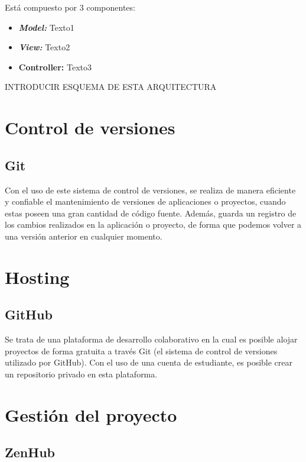 Está compuesto por 3 componentes:
\begin{itemize}
\tightlist
\item
\textit{\textbf{Model: }} Texto1
\item
\textit{\textbf{View: }} Texto2
\item
\textbf{\textbf{Controller: }} Texto3
\end{itemize}


INTRODUCIR ESQUEMA DE ESTA ARQUITECTURA


\section{Control de versiones}\label{control_de_versiones}

\subsection{Git}\label{git}

Con el uso de este sistema de control de versiones, se realiza de manera eficiente y confiable el mantenimiento de versiones de aplicaciones o proyectos, cuando estas poseen una gran cantidad de código fuente. Además, guarda un registro de los cambios realizados en la aplicación o proyecto, de forma que podemos volver a una versión anterior en cualquier momento.

\section{Hosting}\label{hosting}

\subsection{GitHub}\label{github}

Se trata de una plataforma de desarrollo colaborativo en la cual es posible alojar proyectos de forma gratuita a través Git (el sistema de control de versiones utilizado por GitHub). Con el uso de una cuenta de estudiante, es posible crear un repositorio privado en esta plataforma.

\section{Gestión del proyecto}\label{gestion_del_proyecto}

\subsection{ZenHub}\label{zenhub}

